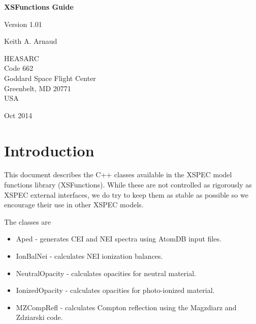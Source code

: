 \documentclass[11pt]{book}
\begin{document}
\begin{titlepage}
\normalsize
\vspace*{4.0cm}
\begin{center}
{\Huge \bf XSFunctions Guide}\\
\end{center}
\medskip
\medskip
\begin{center}
{\Large Version 1.01 \\}
\end{center}
\bigskip
\begin{center}
{\Large Keith A. Arnaud \\}
\end{center}
\medskip
\medskip
\begin{center}
{HEASARC\\
Code 662\\
Goddard Space Flight Center\\
Greenbelt, MD 20771\\
USA}
\end{center}

\vfill
\bigskip
\begin{center}
{\Large Oct 2014\\}
\end{center}
\vfill
\end{titlepage}


\tableofcontents
{}
\chapter{Introduction}

This document describes the C++ classes available in the XSPEC model
functions library (XSFunctions). While these are not controlled as
rigorously as XSPEC external interfaces, we do try to keep them as
stable as possible so we encourage their use in other XSPEC models.

The classes are
\begin{itemize}

\item Aped - generates CEI and NEI spectra using AtomDB input files.

\item IonBalNei - calculates NEI ionization balances.

\item NeutralOpacity - calculates opacities for neutral material.

\item IonizedOpacity - calculates opacities for photo-ionized material.

\item MZCompRefl - calculates Compton reflection using the Magzdiarz
  and Zdziarski code.

\end{itemize}
\end{document}
